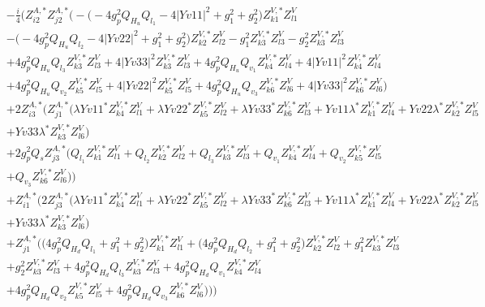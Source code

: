 \begin{align} 
 &-\frac{i}{4} \Big(Z^{A,*}_{i 2} Z^{A,*}_{j 2} \Big(- \Big(-4 g_{p}^{2} Q_{H_u} Q_{l_1}  -4 |Yv11|^2  + g_{1}^{2} + g_{2}^{2}\Big)Z^{V,*}_{k 1} Z_{{l 1}}^{V} \nonumber \\ 
 &- \Big(-4 g_{p}^{2} Q_{H_u} Q_{l_2}  -4 |Yv22|^2  + g_{1}^{2} + g_{2}^{2}\Big)Z^{V,*}_{k 2} Z_{{l 2}}^{V} - g_{1}^{2} Z^{V,*}_{k 3} Z_{{l 3}}^{V} - g_{2}^{2} Z^{V,*}_{k 3} Z_{{l 3}}^{V} \nonumber \\ 
 &+4 g_{p}^{2} Q_{H_u} Q_{l_3} Z^{V,*}_{k 3} Z_{{l 3}}^{V} +4 |Yv33|^2 Z^{V,*}_{k 3} Z_{{l 3}}^{V} +4 g_{p}^{2} Q_{H_u} Q_{v_1} Z^{V,*}_{k 4} Z_{{l 4}}^{V} +4 |Yv11|^2 Z^{V,*}_{k 4} Z_{{l 4}}^{V} \nonumber \\ 
 &+4 g_{p}^{2} Q_{H_u} Q_{v_2} Z^{V,*}_{k 5} Z_{{l 5}}^{V} +4 |Yv22|^2 Z^{V,*}_{k 5} Z_{{l 5}}^{V} +4 g_{p}^{2} Q_{H_u} Q_{v_3} Z^{V,*}_{k 6} Z_{{l 6}}^{V} +4 |Yv33|^2 Z^{V,*}_{k 6} Z_{{l 6}}^{V} \Big)\nonumber \\ 
 &+2 Z^{A,*}_{i 3} \Big(Z^{A,*}_{j 1} \Big(\lambda Yv11^* Z^{V,*}_{k 4} Z_{{l 1}}^{V} +\lambda Yv22^* Z^{V,*}_{k 5} Z_{{l 2}}^{V} +\lambda Yv33^* Z^{V,*}_{k 6} Z_{{l 3}}^{V} +Yv11 \lambda^* Z^{V,*}_{k 1} Z_{{l 4}}^{V} +Yv22 \lambda^* Z^{V,*}_{k 2} Z_{{l 5}}^{V} \nonumber \\ 
 &+Yv33 \lambda^* Z^{V,*}_{k 3} Z_{{l 6}}^{V} \Big)\nonumber \\ 
 &+2 g_{p}^{2} Q_s Z^{A,*}_{j 3} \Big(Q_{l_1} Z^{V,*}_{k 1} Z_{{l 1}}^{V} +Q_{l_2} Z^{V,*}_{k 2} Z_{{l 2}}^{V} +Q_{l_3} Z^{V,*}_{k 3} Z_{{l 3}}^{V} +Q_{v_1} Z^{V,*}_{k 4} Z_{{l 4}}^{V} +Q_{v_2} Z^{V,*}_{k 5} Z_{{l 5}}^{V} \nonumber \\ 
 &+Q_{v_3} Z^{V,*}_{k 6} Z_{{l 6}}^{V} \Big)\Big)\nonumber \\ 
 &+Z^{A,*}_{i 1} \Big(2 Z^{A,*}_{j 3} \Big(\lambda Yv11^* Z^{V,*}_{k 4} Z_{{l 1}}^{V} +\lambda Yv22^* Z^{V,*}_{k 5} Z_{{l 2}}^{V} +\lambda Yv33^* Z^{V,*}_{k 6} Z_{{l 3}}^{V} +Yv11 \lambda^* Z^{V,*}_{k 1} Z_{{l 4}}^{V} +Yv22 \lambda^* Z^{V,*}_{k 2} Z_{{l 5}}^{V} \nonumber \\ 
 &+Yv33 \lambda^* Z^{V,*}_{k 3} Z_{{l 6}}^{V} \Big)\nonumber \\ 
 &+Z^{A,*}_{j 1} \Big(\Big(4 g_{p}^{2} Q_{H_d} Q_{l_1}  + g_{1}^{2} + g_{2}^{2}\Big)Z^{V,*}_{k 1} Z_{{l 1}}^{V} +\Big(4 g_{p}^{2} Q_{H_d} Q_{l_2}  + g_{1}^{2} + g_{2}^{2}\Big)Z^{V,*}_{k 2} Z_{{l 2}}^{V} +g_{1}^{2} Z^{V,*}_{k 3} Z_{{l 3}}^{V} \nonumber \\ 
 &+g_{2}^{2} Z^{V,*}_{k 3} Z_{{l 3}}^{V} +4 g_{p}^{2} Q_{H_d} Q_{l_3} Z^{V,*}_{k 3} Z_{{l 3}}^{V} +4 g_{p}^{2} Q_{H_d} Q_{v_1} Z^{V,*}_{k 4} Z_{{l 4}}^{V} \nonumber \\ 
 &+4 g_{p}^{2} Q_{H_d} Q_{v_2} Z^{V,*}_{k 5} Z_{{l 5}}^{V} +4 g_{p}^{2} Q_{H_d} Q_{v_3} Z^{V,*}_{k 6} Z_{{l 6}}^{V} \Big)\Big)\Big)\end{align} 
